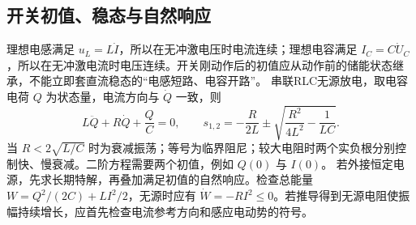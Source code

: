 \subsection{开关初值、稳态与自然响应}
理想电感满足 $u_L=L\dot I$，所以在无冲激电压时电流连续；理想电容满足 $I_C=C\dot U_C$，所以在无冲激电流时电压连续。开关刚动作后的初值应从动作前的储能状态继承，不能立即套直流稳态的“电感短路、电容开路”。
串联RLC无源放电，取电容电荷 $Q$ 为状态量，电流方向与 $\dot Q$ 一致，则
\[
 L\ddot Q+R\dot Q+\frac QC=0,
 \qquad s_{1,2}=-\frac R{2L}\pm\sqrt{\frac{R^2}{4L^2}-\frac1{LC}}.
\]
当 $R<2\sqrt{L/C}$ 时为衰减振荡；等号为临界阻尼；较大电阻时两个实负根分别控制快、慢衰减。二阶方程需要两个初值，例如 $Q(0)$ 与 $I(0)$。
若外接恒定电源，先求长期特解，再叠加满足初值的自然响应。检查总能量
$W=Q^2/(2C)+LI^2/2$，无源时应有 $\dot W=-RI^2\le0$。若推导得到无源电阻使振幅持续增长，应首先检查电流参考方向和感应电动势的符号。

